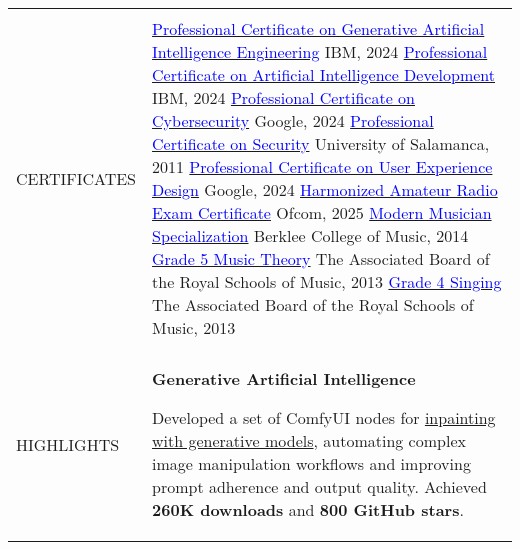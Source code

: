 \documentclass[letterpaper,10pt,oneside]{article}
\newcommand{\DatestampY}[1]{#1}
\newcommand{\itemspacingtwo}{\vspace{0.04cm}}
\newcommand{\sref}[2]{%
    \href{https://0/local/attachments/#1}{\textcolor{blue}{#2}}%
}
\newenvironment{body}
{\par\par
\begin{longtable}{p{0.145\textwidth}p{0.81\textwidth}}}
{\par\end{longtable}\par}
\renewcommand{\section}[3]{\\[-0.35cm]\pdfbookmark[2]{#2}{#3}\\%
\raggedleft  %
{\fontsize{9.5pt}{9.5pt}\selectfont\bfseries\raggedright%
\MakeUppercase{#1}}&}
\begin{document}
\begin{body}
\section{Certificates}{Certificates}{PDF:Certificates}
\sref{Certificate-Coursera-IBM-GenerativeAIEngineering.pdf}{Professional Certificate on Generative Artificial Intelligence Engineering} \textemdash{ }IBM, \DatestampY{2024} \newline
\sref{Certificate-Coursera-IBM-AIDeveloper.pdf}{Professional Certificate on Artificial Intelligence Development} \textemdash{ }IBM, \DatestampY{2024} \newline
\sref{Certificate-Coursera-Google-Cybersecurity.pdf}{Professional Certificate on Cybersecurity} \textemdash{ }Google, \DatestampY{2024} \newline
\sref{Certificate-Certyred.pdf}{Professional Certificate on Security} \textemdash{ }University of Salamanca, \DatestampY{2011} \newline
\sref{Certificate-Coursera-Google-UX-Design.pdf}{Professional Certificate on User Experience Design} \textemdash{ }Google, \DatestampY{2024} \newline
\sref{Certificate-HAREC.pdf}{Harmonized Amateur Radio Exam Certificate} \textemdash{ }Ofcom, \DatestampY{2025} \newline
\sref{Diploma-BerkleeCollege-ModernMusician.pdf}{Modern Musician Specialization} \textemdash{ }Berklee College of Music, \DatestampY{2014} \newline
\sref{Diploma-ABRSM-MusicTheory5.pdf}{Grade 5 Music Theory} \textemdash{ }The Associated Board of the Royal Schools of Music, \DatestampY{2013} \newline
\sref{Diploma-ABRSM-SingingGrade4.pdf}{Grade 4 Singing} \textemdash{ }The Associated Board of the Royal Schools of Music, \DatestampY{2013}

\section{Highlights}{Highlights}{PDF:Highlights}
\textbf{Generative Artificial Intelligence}
\begin{comp}
\item Developed a set of ComfyUI nodes for \href{https://registry.comfy.org/nodes/comfyui-inpaint-cropandstitch}{inpainting with generative models}, automating complex image manipulation workflows and improving prompt adherence and output quality.
    \newline Achieved \textbf{260K downloads} and \textbf{800 GitHub stars}.
\end{comp}
\itemspacingtwo


\end{body}
\end{document}
